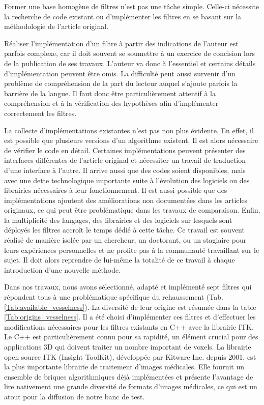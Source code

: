 Former une base homogène de filtres n'est pas une tâche simple. Celle-ci nécessite la recherche de code existant ou d'implémenter les filtres en se basant sur la méthodologie de l'article original.

Réaliser l'implémentation d'un filtre à partir des indications de l'auteur est parfois complexe, car il doit souvent se soumettre à un exercice de concision lors de la publication de ses travaux. L'auteur va donc à l'essentiel et certains détails d'implémentation peuvent être omis. La difficulté peut aussi survenir d'un problème de compréhension de la part du lecteur auquel s'ajoute parfois la barrière de la langue. Il faut donc être particulièrement attentif à la compréhension et à la vérification des hypothèses afin d'implémenter correctement les filtres. 

La collecte d'implémentations existantes n'est pas non plus évidente. En effet, il est possible que plusieurs versions d'un algorithme existent. Il est alors nécessaire de vérifier le code en détail. Certaines implémentations peuvent présenter des interfaces différentes de l'article original et nécessiter un travail de traduction d'une interface à l'autre. Il arrive aussi que des codes soient disponibles, mais avec une dette technologique importante suite à l'évolution des logiciels ou des librairies nécessaires à leur fonctionnement. Il est aussi possible que des implémentations ajoutent des améliorations non documentées dans les articles originaux, ce qui peut être problématique dans les travaux de comparaison. Enfin, la multiplicité des langages, des librairies et des logiciels sur lesquels sont déployés les filtres accroît le temps dédié à cette tâche. Ce travail est souvent réalisé de manière isolée par un chercheur, un doctorant, ou un stagiaire pour leurs expériences personnelles et ne profite pas à la communauté travaillant sur le sujet. Il doit alors reprendre de lui-même la totalité de ce travail à chaque introduction d'une nouvelle méthode.

Dans nos travaux, nous avons sélectionné, adapté et implémenté sept filtres qui répondent tous à une problématique spécifique du rehaussement (Tab. \ref{Tab:available_vesselness}). La diversité de leur origine est résumée dans la table \ref{Tab:origins_vesselness}. Il a été choisi d'implémenter ces filtres et d'effectuer les modifications nécessaires pour les filtres existants en C++ avec la librairie ITK. Le C++ est particulièrement connu pour sa rapidité, un élément crucial pour des applications 3D qui doivent traiter un nombre important de voxels. La librairie open source ITK (Insight ToolKit), développée par Kitware Inc. depuis 2001, est la plus importante librairie de traitement d'images médicales. Elle fournit un ensemble de briques algorithmiques déjà implémentées et présente l'avantage de lire nativement une grande diversité de formats d'images médicales, ce qui est un atout pour la diffusion de notre banc de test.

